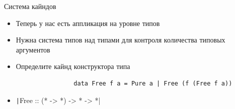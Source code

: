     \begin{frame}[fragile]{Система кайндов}
        \begin{itemize}
            \item Теперь у нас есть аппликация на уровне типов
            \item Нужна система типов над типами для контроля количества типовых аргументов
        \end{itemize}
        \begin{center}
        \end{center}
        \begin{itemize}
            \item[\todo] \pause Определите кайнд конструктора типа
            \begin{verbatim}
                data Free f a = Pure a | Free (f (Free f a))
            \end{verbatim}
            \item[\answer] \pause \texttt|Free :: (* -> *) -> * -> *|
        \end{itemize}
    \end{frame}


